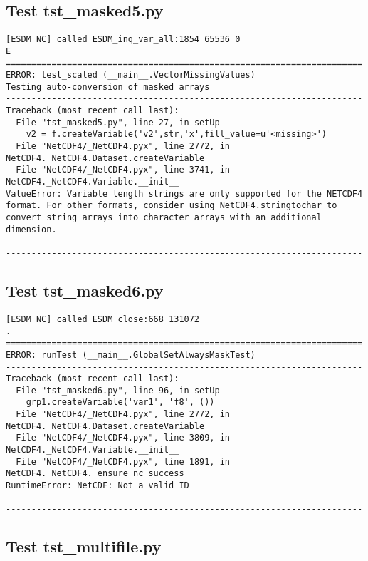 \subsection{Test tst\_masked5.py}

\begin{verbatim}
[ESDM NC] called ESDM_inq_var_all:1854 65536 0
E
======================================================================
ERROR: test_scaled (__main__.VectorMissingValues)
Testing auto-conversion of masked arrays
----------------------------------------------------------------------
Traceback (most recent call last):
  File "tst_masked5.py", line 27, in setUp
    v2 = f.createVariable('v2',str,'x',fill_value=u'<missing>')
  File "NetCDF4/_NetCDF4.pyx", line 2772, in NetCDF4._NetCDF4.Dataset.createVariable
  File "NetCDF4/_NetCDF4.pyx", line 3741, in NetCDF4._NetCDF4.Variable.__init__
ValueError: Variable length strings are only supported for the NETCDF4 format. For other formats, consider using NetCDF4.stringtochar to convert string arrays into character arrays with an additional dimension.

----------------------------------------------------------------------
\end{verbatim}

\subsection{Test tst\_masked6.py}

\begin{verbatim}
[ESDM NC] called ESDM_close:668 131072
.
======================================================================
ERROR: runTest (__main__.GlobalSetAlwaysMaskTest)
----------------------------------------------------------------------
Traceback (most recent call last):
  File "tst_masked6.py", line 96, in setUp
    grp1.createVariable('var1', 'f8', ())
  File "NetCDF4/_NetCDF4.pyx", line 2772, in NetCDF4._NetCDF4.Dataset.createVariable
  File "NetCDF4/_NetCDF4.pyx", line 3809, in NetCDF4._NetCDF4.Variable.__init__
  File "NetCDF4/_NetCDF4.pyx", line 1891, in NetCDF4._NetCDF4._ensure_nc_success
RuntimeError: NetCDF: Not a valid ID

----------------------------------------------------------------------
\end{verbatim}

\subsection{Test tst\_multifile.py}

